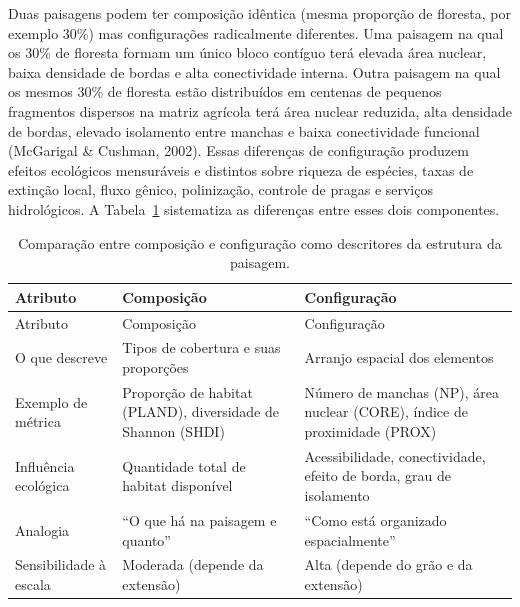 \documentclass[
  portuguese,
  11pt,
  a4paper,
  open=any]{scrbook}
\begin{document}
Duas paisagens podem ter composição idêntica (mesma proporção de
floresta, por exemplo 30\%) mas configurações radicalmente diferentes.
Uma paisagem na qual os 30\% de floresta formam um único bloco contíguo
terá elevada área nuclear, baixa densidade de bordas e alta
conectividade interna. Outra paisagem na qual os mesmos 30\% de floresta
estão distribuídos em centenas de pequenos fragmentos dispersos na
matriz agrícola terá área nuclear reduzida, alta densidade de bordas,
elevado isolamento entre manchas e baixa conectividade funcional
(McGarigal \& Cushman, 2002). Essas diferenças de configuração produzem
efeitos ecológicos mensuráveis e distintos sobre riqueza de espécies,
taxas de extinção local, fluxo gênico, polinização, controle de pragas e
serviços hidrológicos. A Tabela~\ref{tbl-composicao-configuracao}
sistematiza as diferenças entre esses dois componentes.

\begin{longtable}[]{@{}
  >{\raggedright\arraybackslash}p{}
  >{\raggedright\arraybackslash}p{}
  >{\raggedright\arraybackslash}p{}@{}}
\caption{Comparação entre composição e configuração como descritores da
estrutura da
paisagem.}\label{tbl-composicao-configuracao}\tabularnewline
\toprule\noalign{}
\begin{minipage}[b]{\linewidth}\raggedright
Atributo
\end{minipage} & \begin{minipage}[b]{\linewidth}\raggedright
Composição
\end{minipage} & \begin{minipage}[b]{\linewidth}\raggedright
Configuração
\end{minipage} \\
\midrule\noalign{}
\endfirsthead
\toprule\noalign{}
\begin{minipage}[b]{\linewidth}\raggedright
Atributo
\end{minipage} & \begin{minipage}[b]{\linewidth}\raggedright
Composição
\end{minipage} & \begin{minipage}[b]{\linewidth}\raggedright
Configuração
\end{minipage} \\
\midrule\noalign{}
\endhead
\bottomrule\noalign{}
\endlastfoot
O que descreve & Tipos de cobertura e suas proporções & Arranjo espacial
dos elementos \\
Exemplo de métrica & Proporção de habitat (PLAND), diversidade de
Shannon (SHDI) & Número de manchas (NP), área nuclear (CORE), índice de
proximidade (PROX) \\
Influência ecológica & Quantidade total de habitat disponível &
Acessibilidade, conectividade, efeito de borda, grau de isolamento \\
Analogia & ``O que há na paisagem e quanto'' & ``Como está organizado
espacialmente'' \\
Sensibilidade à escala & Moderada (depende da extensão) & Alta (depende
do grão e da extensão) \\
\end{longtable}
\end{document}

